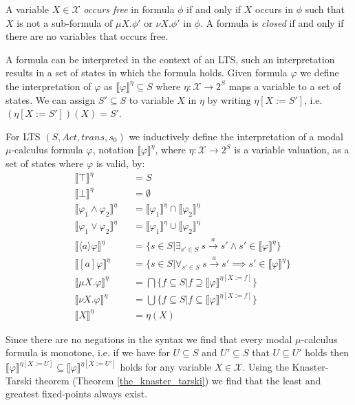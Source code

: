 A variable $X \in \mathcal{X}$ \textit{occurs free} in formula $\phi$ if and only if $X$ occurs in $\phi$ such that $X$ is not a sub-formula of $\mu X.\phi'$ or $\nu X.\phi'$ in $\phi$. A formula is \textit{closed} if and only if there are no variables that occurs free.

A formula can be interpreted in the context of an LTS, such an interpretation results in a set of states in which the formula holds. Given formula $\varphi$ we define the interpretation of $\varphi$ as $\llbracket \varphi \rrbracket ^\eta  \subseteq S$ where $\eta : \mathcal{X}\rightarrow 2^S$ maps a variable to a set of states. We can assign $S' \subseteq S$ to variable $X$ in $\eta$ by writing $\eta[X:=S']$, i.e. $(\eta[X:=S'])(X) = S'$.
\begin{definition}
	\label{def_mu_sem} For LTS $(S, Act, trans, s_0)$ we inductively define the interpretation of a modal $\mu$-calculus formula $\varphi$, notation
	$\llbracket \varphi \rrbracket^\eta$, where $\eta : \mathcal{X} \rightarrow 2^S$ is a variable valuation, as a set of states
	where $\varphi$ is valid, by:
	\begin{align*}
	&\llbracket {\top} \rrbracket^\eta &&= S\\
	&\llbracket {\bot} \rrbracket^\eta &&= \emptyset\\
	&\llbracket \varphi_1 \wedge \varphi_2 \rrbracket^\eta &&= \llbracket \varphi_1 \rrbracket^\eta \cap \llbracket \varphi_2 \rrbracket^\eta \\
	&\llbracket \varphi_1 \vee \varphi_2 \rrbracket^\eta &&= \llbracket \varphi_1 \rrbracket^\eta \cup \llbracket \varphi_2 \rrbracket^\eta\\
	&\llbracket \langle a \rangle \varphi \rrbracket^\eta &&= \{s \in S|\exists_{s' \in S}\ s \xrightarrow {a} s' \wedge s' \in \llbracket \varphi \rrbracket^\eta\}\\
	&\llbracket [ a ] \varphi \rrbracket^\eta &&= \{s \in S|\forall_{s' \in S}\ s \xrightarrow {a} s' \implies s' \in \llbracket \varphi \rrbracket^\eta\}\\
	&\llbracket \mu X. \varphi \rrbracket^\eta &&= \bigcap\{f \subseteq S | f \supseteq \llbracket \varphi \rrbracket^{\eta[X:=f]}\}\\
	&\llbracket \nu X. \varphi \rrbracket^\eta &&= \bigcup\{f \subseteq S | f \subseteq \llbracket \varphi \rrbracket^{\eta[X:=f]}\}\\
	&\llbracket X \rrbracket^\eta &&= \eta(X)
	\end{align*}
\end{definition}
Since there are no negations in the syntax we find that every modal $\mu$-calculus formula is monotone, i.e. if we have for $U \subseteq S$ and $U' \subseteq S$ that $U \subseteq U'$ holds then $\llbracket \varphi \rrbracket^{\eta[X:=U]} \subseteq \llbracket \varphi \rrbracket^{\eta[X:=U']}$ holds for any variable $X \in \mathcal{X}$. Using the Knaster-Tarski theorem (Theorem \ref{the_knaster_tarski}) we find that the least and greatest fixed-points always exist.

